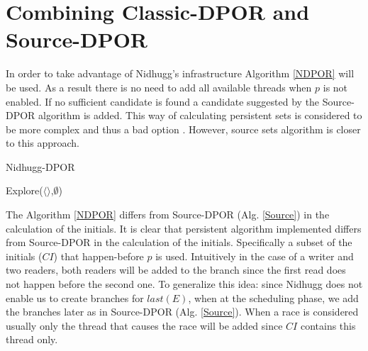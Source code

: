 \section{Combining Classic-DPOR and Source-DPOR}

In order to take advantage of Nidhugg's infrastructure Algorithm \ref{NDPOR} will be used. As a result there is no need to add all
available threads when $p$ is not enabled. If no sufficient candidate is found
a candidate suggested by the Source-DPOR algorithm is added. This way of calculating persistent sets is considered to be more 
complex and thus a bad option \cite{Gode05}. However, source sets algorithm is closer to this approach.

\begin{algorithm}
    \caption{Nidhugg-DPOR}
    \label{NDPOR}
    Explore($\langle \rangle$,$\emptyset$)\;
\end{algorithm}

The Algorithm \ref{NDPOR} differs from Source-DPOR (Alg. \ref{Source}) in the calculation of the initials. It is clear
that persistent algorithm implemented differs from Source-DPOR in the calculation of the initials. Specifically a subset
of the initials ($CI$) that happen-before $p$ is used. Intuitively in the case of a writer and two readers, both readers
will be added to the branch since the first read does not happen before the second one. To generalize this idea: since
Nidhugg does not enable us to create branches for $last(E)$, when at the scheduling phase, we add the branches later as
in Source-DPOR (Alg. \ref{Source}). When a race is considered usually only the thread that causes the race will be added
since $CI$ contains this thread only.

